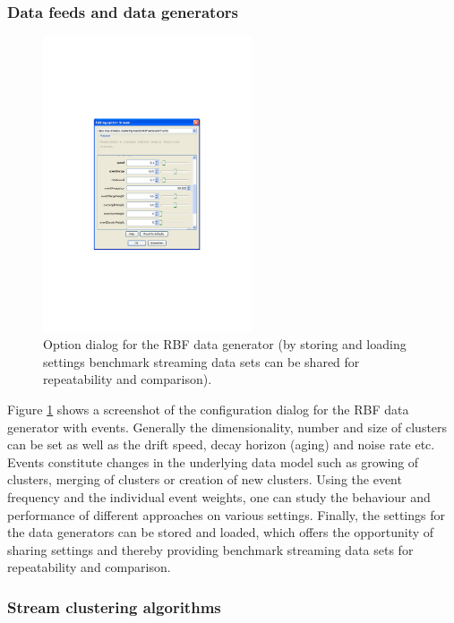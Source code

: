 \documentclass[a4paper,12pt,twoside]{book}
\begin{document}
\subsubsection{Data feeds and data generators}
\label{sec:generators}

\begin{figure}[t]
	\centering
		\includegraphics[width=0.55\textwidth]{figures/SetupTab}
	\caption{Option dialog for the RBF data generator (by storing and loading settings benchmark streaming data sets can be shared for repeatability and comparison).}
	\label{fig:framework}
\end{figure}
Figure \ref{fig:framework} shows a screenshot of the configuration dialog for the RBF data generator with events. 
Generally the dimensionality, number and size of clusters can be set as well as the drift speed, decay horizon (aging) and noise rate etc.
 Events constitute changes in the underlying data model such as growing of clusters, merging of clusters or creation of new clusters. 
Using the event frequency and the individual event weights, one can study the behaviour and performance of different approaches on various settings. 
Finally, the settings for the data generators can be stored and loaded, which offers the opportunity of sharing settings and thereby providing benchmark streaming data 
sets for repeatability and comparison. 

\subsubsection{Stream clustering algorithms}
\label{sec:algos}
\end{document}
